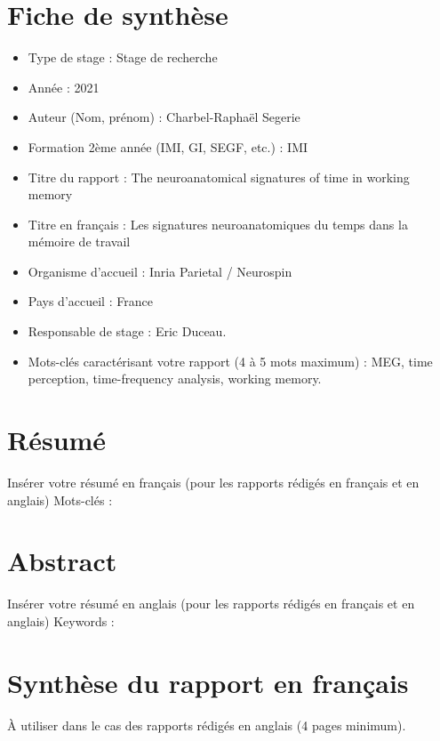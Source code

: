 \chapter*{\centering Fiche de synthèse}
\begin{itemize}
    \item Type de stage : Stage de recherche
    \item Année : 2021
    \item Auteur (Nom, prénom) : Charbel-Raphaël Segerie
    \item Formation 2ème année (IMI, GI, SEGF, etc.) : IMI
    \item Titre du rapport : The neuroanatomical signatures of time in working memory
    \item Titre en français : Les signatures neuroanatomiques du temps dans la mémoire de travail
    \item Organisme d’accueil : Inria Parietal / Neurospin
    \item Pays d’accueil : France
    \item Responsable de stage : Eric Duceau.
    \item Mots-clés caractérisant votre rapport (4 à 5 mots maximum) : MEG, time perception, time-frequency analysis, working memory.
\end{itemize}




\chapter*{\centering Résumé}

Insérer votre résumé en français (pour les rapports rédigés en français et en anglais)
Mots-clés :

\chapter*{\centering Abstract}

Insérer votre résumé en anglais (pour les rapports rédigés en français et en anglais)
Keywords :

\chapter*{\centering Synthèse du rapport en français}

À utiliser dans le cas des rapports rédigés en anglais (4 pages minimum).
